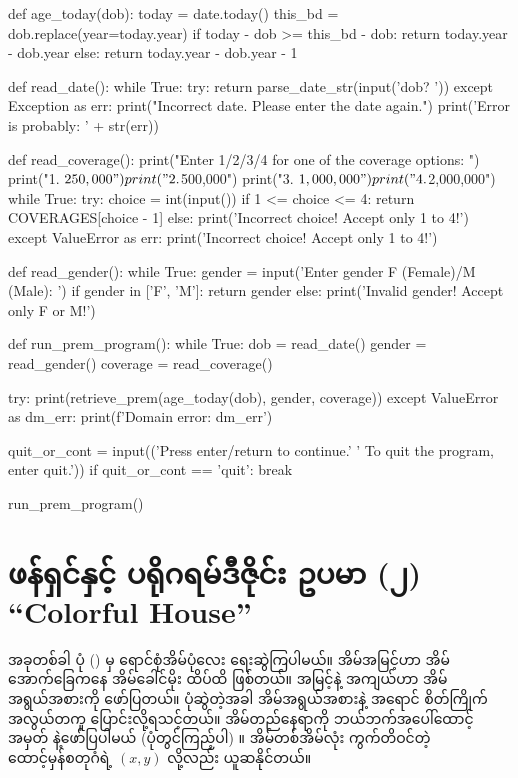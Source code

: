 \begin{py}
def age_today(dob):
    today = date.today()
    this_bd = dob.replace(year=today.year)
    if today - dob >= this_bd - dob:
        return today.year - dob.year
    else:
        return today.year - dob.year - 1


def read_date():
    while True:
        try:
            return parse_date_str(input('dob? '))
        except Exception as err:
            print("Incorrect date. Please enter the date again.")
            print('Error is probably: ' + str(err))


def read_coverage():
    print("Enter 1/2/3/4 for one of the coverage options: ")
    print("1. $250,000")
    print("2. $500,000")
    print("3. $1,000,000")
    print("4. $2,000,000")
    while True:
        try:
            choice = int(input())
            if 1 <= choice <= 4:
                return COVERAGES[choice - 1]
            else:
                print('Incorrect choice! Accept only 1 to 4!')
        except ValueError as err:
            print('Incorrect choice! Accept only 1 to 4!')


def read_gender():
    while True:
        gender = input('Enter gender F (Female)/M (Male): ')
        if gender in ['F', 'M']:
            return gender
        else:
            print('Invalid gender! Accept only F or M!')


def run_prem_program():
    while True:
        dob = read_date()
        gender = read_gender()
        coverage = read_coverage()

        try:
            print(retrieve_prem(age_today(dob),
                                gender,
                                coverage))
        except ValueError as dm_err:
            print(f'Domain error: {dm_err}')

        quit_or_cont = input(('Press enter/return to continue.'
                              ' To quit the program, enter quit.'))
        if quit_or_cont == 'quit':
            break


run_prem_program()

\end{py}
%

\section{ဖန်ရှင်နှင့် ပရိုဂရမ်ဒီဇိုင်း ဥပမာ (၂) “Colorful House”}

အခုတစ်ခါ ပုံ (\fRefNo{\ref{fig:colorful_house}}) မှ ရောင်စုံအိမ်ပုံလေး ရေးဆွဲကြပါမယ်။ အိမ်အမြင့်ဟာ အိမ်အောက်ခြေကနေ အိမ်ခေါင်မိုး ထိပ်ထိ ဖြစ်တယ်။ အမြင့်နဲ့ အကျယ်ဟာ အိမ်အရွယ်အစားကို ဖော်ပြတယ်။ ပုံဆွဲတဲ့အခါ အိမ်အရွယ်အစားနဲ့ အရောင် စိတ်ကြိုက် အလွယ်တကူ ပြောင်းလို့ရသင့်တယ်။ အိမ်တည်နေရာကို ဘယ်ဘက်အပေါ်ထောင့်အမှတ် နဲ့ဖော်ပြပါမယ် (ပုံတွင်ကြည့်ပါ) ။ အိမ်တစ်အိမ်လုံး ကွက်\allowbreak တိဝင်တဲ့ ထောင့်မှန်စတုဂံရဲ့ $(x, y)$ လို့လည်း ယူဆနိုင်တယ်။ 

